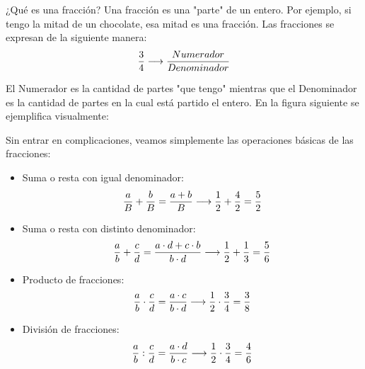 ¿Qué es una fracción? Una fracción es una "parte" de un entero. Por ejemplo, si tengo la mitad de un chocolate, esa mitad es una fracción. Las fracciones se expresan de la siguiente manera:\\

\begin{equation}
    \notag
    \frac{3}{4} \longrightarrow \frac{Numerador}{Denominador}
\end{equation}


El Numerador es la cantidad de partes "que tengo" mientras que el Denominador es la cantidad de partes en la cual está partido el entero. En la figura siguiente se ejemplifica visualmente: 

\begin{figure}[H]
\centering
{}
\label{1.0}
\end{figure}

Sin entrar en complicaciones, veamos simplemente las operaciones básicas de las fracciones: \\

\begin{itemize}
    \item Suma o resta con igual denominador: 
    \begin{equation}
        \notag
         \frac{a}{B} + \frac{b}{B} = \frac{a+ b}{B} \longrightarrow \frac{1}{2} + \frac{4}{2} = \frac{5}{2}
    \end{equation}
    \item Suma o resta con distinto denominador:
    \begin{equation}
        \notag
         \frac{a}{b} + \frac{c}{d} = \frac{a\cdot d + c\cdot b}{b\cdot d} \longrightarrow \frac{1}{2} + \frac{1}{3}=\frac{5}{6}
    \end{equation}
    \item Producto de fracciones: 
    \begin{equation}
        \notag
        \frac{a}{b}\cdot \frac{c}{d}=\frac{a\cdot c }{b \cdot d} \longrightarrow \frac{1}{2}\cdot \frac{3}{4}=\frac{3}{8}
    \end{equation}
    \item División de fracciones: 
    \begin{equation}
        \notag
            \frac{a}{b} : \frac{c}{d}=\frac{a\cdot d }{b \cdot c} \longrightarrow \frac{1}{2}\cdot \frac{3}{4}=\frac{4}{6}
    \end{equation}
\end{itemize}

